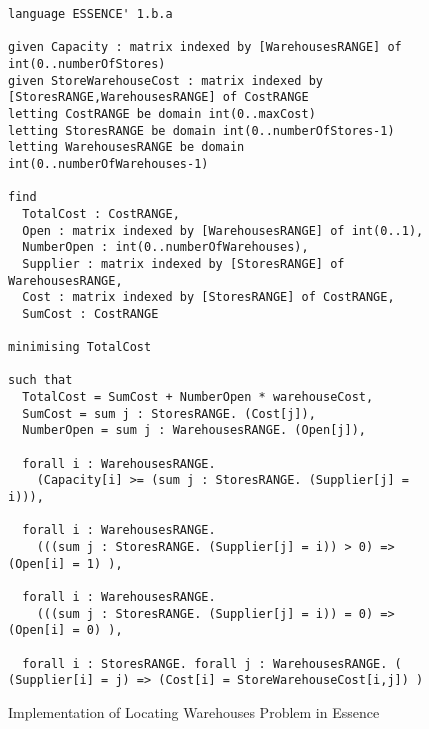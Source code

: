 \begin{figure}
\caption{\label{benchmark-essence:lw}Implementation of Locating Warehouses Problem in Essence}
\begin{lstlisting}
language ESSENCE' 1.b.a

given Capacity : matrix indexed by [WarehousesRANGE] of int(0..numberOfStores)
given StoreWarehouseCost : matrix indexed by [StoresRANGE,WarehousesRANGE] of CostRANGE
letting CostRANGE be domain int(0..maxCost)
letting StoresRANGE be domain int(0..numberOfStores-1)
letting WarehousesRANGE be domain int(0..numberOfWarehouses-1)

find 
  TotalCost : CostRANGE,
  Open : matrix indexed by [WarehousesRANGE] of int(0..1),
  NumberOpen : int(0..numberOfWarehouses),
  Supplier : matrix indexed by [StoresRANGE] of WarehousesRANGE,
  Cost : matrix indexed by [StoresRANGE] of CostRANGE,
  SumCost : CostRANGE
  
minimising TotalCost

such that
  TotalCost = SumCost + NumberOpen * warehouseCost,
  SumCost = sum j : StoresRANGE. (Cost[j]),
  NumberOpen = sum j : WarehousesRANGE. (Open[j]),

  forall i : WarehousesRANGE.  
	(Capacity[i] >= (sum j : StoresRANGE. (Supplier[j] = i))),

  forall i : WarehousesRANGE.  
	(((sum j : StoresRANGE. (Supplier[j] = i)) > 0) => (Open[i] = 1) ),

  forall i : WarehousesRANGE.  
	(((sum j : StoresRANGE. (Supplier[j] = i)) = 0) => (Open[i] = 0) ),
  
  forall i : StoresRANGE. forall j : WarehousesRANGE. ( (Supplier[i] = j) => (Cost[i] = StoreWarehouseCost[i,j]) )
\end{lstlisting}
\end{figure}